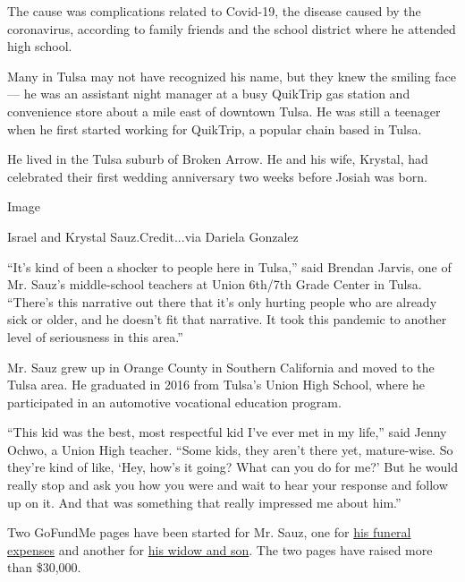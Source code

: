 The cause was complications related to Covid-19, the disease caused by
the coronavirus, according to family friends and the school district
where he attended high school.

Many in Tulsa may not have recognized his name, but they knew the
smiling face --- he was an assistant night manager at a busy QuikTrip
gas station and convenience store about a mile east of downtown Tulsa.
He was still a teenager when he first started working for QuikTrip, a
popular chain based in Tulsa.

He lived in the Tulsa suburb of Broken Arrow. He and his wife, Krystal,
had celebrated their first wedding anniversary two weeks before Josiah
was born.

Image

Israel and Krystal Sauz.Credit...via Dariela Gonzalez

``It's kind of been a shocker to people here in Tulsa,'' said Brendan
Jarvis, one of Mr. Sauz's middle-school teachers at Union 6th/7th Grade
Center in Tulsa. ``There's this narrative out there that it's only
hurting people who are already sick or older, and he doesn't fit that
narrative. It took this pandemic to another level of seriousness in this
area.''

Mr. Sauz grew up in Orange County in Southern California and moved to
the Tulsa area. He graduated in 2016 from Tulsa's Union High School,
where he participated in an automotive vocational education program.

``This kid was the best, most respectful kid I've ever met in my life,''
said Jenny Ochwo, a Union High teacher. ``Some kids, they aren't there
yet, mature-wise. So they're kind of like, `Hey, how's it going? What
can you do for me?' But he would really stop and ask you how you were
and wait to hear your response and follow up on it. And that was
something that really impressed me about him.''

Two GoFundMe pages have been started for Mr. Sauz, one for
\href{https://www.gofundme.com/f/funeral-expenses-for-israel-sauz?utm_source=customer\&utm_medium=sms\&utm_campaign=p_cf+share-flow-1}{his
funeral expenses} and another for
\href{https://www.gofundme.com/f/for-isreal-sauz039s-widow-amp-son?utm_source=facebook\&utm_medium=social\&utm_campaign=p_cp+share-sheet\&fbclid=IwAR1HTFzFEamwsqOxJvQK-x--tgOAh-0XXmTopTKdQ8AZWQsCu4kXpAYA2nQ}{his
widow and son}. The two pages have raised more than \$30,000.

\href{https://www.nytimes.com/interactive/2020/obituaries/people-died-coronavirus-obituaries.html?action=click\&pgtype=Article\&state=default\&region=BELOW_MAIN_CONTENT\&context=covid_obits_promo}{}

